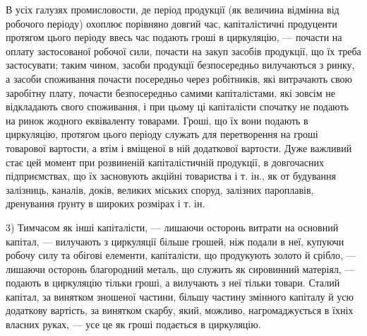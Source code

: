 В усіх галузях промисловости, де період продукції (як величина
відмінна від робочого періоду) охоплює порівняно довгий час, капіталістичні
продуценти протягом цього періоду ввесь час подають гроші в циркуляцію,
— почасти на оплату застосованої робочої сили, почасти на закуп
засобів продукції, що їх треба застосувати; таким чином, засоби продукції
безпосередньо вилучаються з ринку, а засоби споживання почасти посередньо
через робітників, які витрачають свою заробітну плату, почасти
безпосередньо самими капіталістами, які зовсім не відкладають свого
споживання, і при цьому ці капіталісти спочатку не подають на ринок
жодного еквіваленту товарами. Гроші, що їх вони подають в циркуляцію,
протягом цього періоду служать для перетворення на гроші товарової
вартости, а втім і вміщеної в ній додаткової вартости. Дуже важливий
стає цей момент при розвиненій капіталістичній продукції, в довгочасних
підприємствах, що їх засновують акційні товариства і т. ін., як
от будування залізниць, каналів, доків, великих міських споруд, залізних
пароплавів, дренування ґрунту в широких розмірах і т. ін.

3) Тимчасом як інші капіталісти, — лишаючи осторонь витрати на
основний капітал, — вилучають з циркуляції більше грошей, ніж подали в
неї, купуючи робочу силу та обігові елементи, капіталісти, що продукують
золото й срібло, — лишаючи осторонь благородний металь, що служить як
сировинний матеріял, — подають в циркуляцію тільки гроші, а вилучають
з неї тільки товари. Сталий капітал, за винятком зношеної частини,
більшу частину змінного капіталу й усю додаткову вартість, за винятком
скарбу, який, можливо, нагромаджується в їхніх власних руках, — усе це
як гроші подається в циркуляцію.
